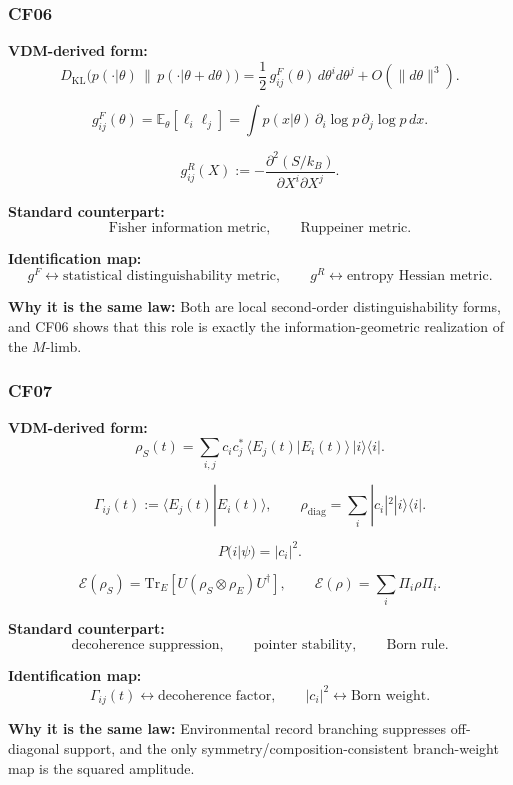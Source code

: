 \documentclass[11pt]{article}
\theoremstyle{definition}
\theoremstyle{plain}
\theoremstyle{remark}
\begin{document}

\subsubsection*{CF06}
\textbf{VDM-derived form:}
\[
D_{\mathrm{KL}}\!\bigl(p(\cdot|\theta)\,\|\,p(\cdot|\theta+d\theta)\bigr)
=
\frac12\,g^F_{ij}(\theta)\,d\theta^i d\theta^j + O(\|d\theta\|^3).
\]

\[
g^F_{ij}(\theta)
=
\mathbb E_\theta[\ell_i\ell_j]
=
\int p(x|\theta)\,\partial_i\log p\,\partial_j\log p\,dx.
\]

\[
g^R_{ij}(X)
:=
-
\frac{\partial^2(S/k_B)}{\partial X^i\partial X^j}.
\]

\textbf{Standard counterpart:}
\[
\text{Fisher information metric},
\qquad
\text{Ruppeiner metric}.
\]

\textbf{Identification map:}
\[
g^F \leftrightarrow \text{statistical distinguishability metric},
\qquad
g^R \leftrightarrow \text{entropy Hessian metric}.
\]

\textbf{Why it is the same law:} Both are local second-order
distinguishability forms, and CF06 shows that this role is exactly the
information-geometric realization of the \(M\)-limb.


\subsubsection*{CF07}
\textbf{VDM-derived form:}
\[
\rho_S(t)
=
\sum_{i,j}
c_i c_j^\ast\,
\langle E_j(t)|E_i(t)\rangle
\,|i\rangle\langle i|.
\]

\[
\Gamma_{ij}(t):=\langle E_j(t)|E_i(t)\rangle,
\qquad
\rho_{\mathrm{diag}}=\sum_i |c_i|^2|i\rangle\langle i|.
\]

\[
P(i|\psi)=|c_i|^2.
\]

\[
\mathcal E(\rho_S)=\mathrm{Tr}_E[U(\rho_S\otimes \rho_E)U^\dagger],
\qquad
\mathcal E(\rho)=\sum_i \Pi_i \rho \Pi_i.
\]

\textbf{Standard counterpart:}
\[
\text{decoherence suppression},
\qquad
\text{pointer stability},
\qquad
\text{Born rule}.
\]

\textbf{Identification map:}
\[
\Gamma_{ij}(t)\leftrightarrow \text{decoherence factor},
\qquad
|c_i|^2 \leftrightarrow \text{Born weight}.
\]

\textbf{Why it is the same law:} Environmental record branching suppresses
off-diagonal support, and the only symmetry/composition-consistent branch-weight
map is the squared amplitude.
\end{document}
